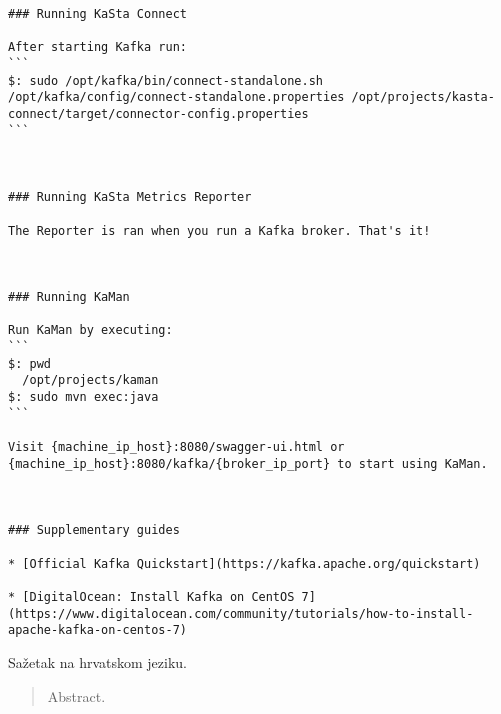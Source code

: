 \documentclass[times, utf8, diplomski, numeric]{fer}
\begin{document}
\begin{lstlisting}[breaklines]
### Running KaSta Connect

After starting Kafka run:  
```
$: sudo /opt/kafka/bin/connect-standalone.sh /opt/kafka/config/connect-standalone.properties /opt/projects/kasta-connect/target/connector-config.properties
```



### Running KaSta Metrics Reporter

The Reporter is ran when you run a Kafka broker. That's it!  



### Running KaMan

Run KaMan by executing:  
```
$: pwd
  /opt/projects/kaman
$: sudo mvn exec:java
```

Visit {machine_ip_host}:8080/swagger-ui.html or {machine_ip_host}:8080/kafka/{broker_ip_port} to start using KaMan.



### Supplementary guides

* [Official Kafka Quickstart](https://kafka.apache.org/quickstart)

* [DigitalOcean: Install Kafka on CentOS 7](https://www.digitalocean.com/community/tutorials/how-to-install-apache-kafka-on-centos-7)
\end{lstlisting}




\begin{sazetak}
Sažetak na hrvatskom jeziku.

\end{sazetak}

\begin{abstract}
Abstract.

\end{abstract}
\end{document}
